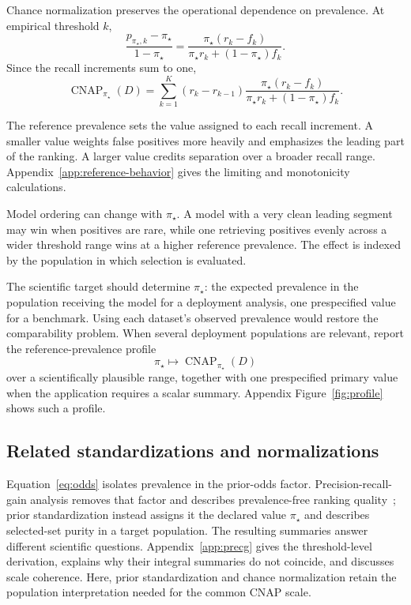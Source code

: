 \documentclass[11pt]{article}
\newcommand{\CNAP}{\operatorname{CNAP}}
\newcommand{\Tpi}{\CNAP_{\pi_\star}}
\theoremstyle{remark}
\begin{document}
Chance normalization preserves the operational dependence on prevalence. At empirical threshold $k$,
\begin{equation}
\frac{p_{\pi_\star,k}-\pi_\star}{1-\pi_\star}
=
\frac{\pi_\star(r_k-f_k)}
{\pi_\star r_k+(1-\pi_\star)f_k}.
\label{eq:threshold-normalized-effect}
\end{equation}
Since the recall increments sum to one,
\begin{equation}
\Tpi(D)
=
\sum_{k=1}^{K}
(r_k-r_{k-1})
\frac{\pi_\star(r_k-f_k)}
{\pi_\star r_k+(1-\pi_\star)f_k}.
\label{eq:T-reference-dependence}
\end{equation}

The reference prevalence sets the value assigned to each recall increment. A smaller value weights false positives more heavily and emphasizes the leading part of the ranking. A larger value credits separation over a broader recall range. Appendix~\ref{app:reference-behavior} gives the limiting and monotonicity calculations.

Model ordering can change with $\pi_\star$. A model with a very clean leading segment may win when positives are rare, while one retrieving positives evenly across a wider threshold range wins at a higher reference prevalence. The effect is indexed by the population in which selection is evaluated.

The scientific target should determine $\pi_\star$: the expected prevalence in the population receiving the model for a deployment analysis, one prespecified value for a benchmark. Using each dataset's observed prevalence would restore the comparability problem. When several deployment populations are relevant, report the reference-prevalence profile
\[
\pi_\star
\longmapsto
\Tpi(D)
\]
over a scientifically plausible range, together with one prespecified primary value when the application requires a scalar summary. Appendix Figure~\ref{fig:profile} shows such a profile.

\subsection{Related standardizations and normalizations}
\label{sec:related-normalizations}

Equation~\eqref{eq:odds} isolates prevalence in the prior-odds factor. Precision-recall-gain analysis removes that factor and describes prevalence-free ranking quality~\cite{flach2015prg}; prior standardization instead assigns it the declared value $\pi_\star$ and describes selected-set purity in a target population. The resulting summaries answer different scientific questions. Appendix~\ref{app:precg} gives the threshold-level derivation, explains why their integral summaries do not coincide, and discusses scale coherence. Here, prior standardization and chance normalization retain the population interpretation needed for the common CNAP scale.
\end{document}
